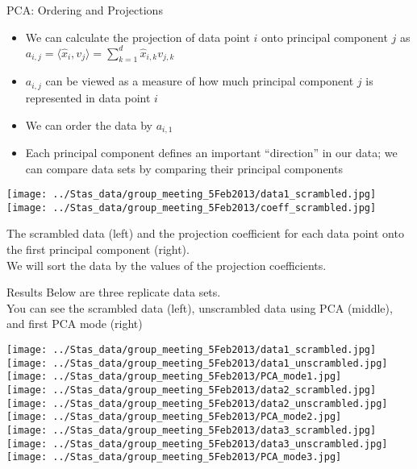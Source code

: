 \begin{frame}{PCA: Ordering and Projections}
    \begin{itemize}
        \item We can calculate the projection of data point $i$ onto principal component $j$ as $a_{i,j} = \langle \hat{x}_i, v_j \rangle = \sum_{k=1}^{d} \hat{x}_{i,k} v_{j,k}$
        \item $a_{i,j}$ can be viewed as a measure of how much principal component $j$ is represented in data point $i$
        \item We can order the data by $a_{i,1}$
        \item Each principal component defines an important ``direction'' in our data; we can compare data sets by comparing their principal components
    \end{itemize}

    \centering
    \texttt{[image: ../Stas\_data/group\_meeting\_5Feb2013/data1\_scrambled.jpg]}
    \texttt{[image: ../Stas\_data/group\_meeting\_5Feb2013/coeff\_scrambled.jpg]}\\
    {\Tiny The scrambled data (left) and the projection coefficient for each data point onto the first principal component (right).\\
    We will sort the data by the values of the projection coefficients. \par}

\end{frame}

\begin{frame}{Results}
  \centering
    Below are three replicate data sets.\\
    You can see the scrambled data (left), unscrambled data using PCA (middle), and first PCA mode (right)

    \texttt{[image: ../Stas\_data/group\_meeting\_5Feb2013/data1\_scrambled.jpg]}
    \texttt{[image: ../Stas\_data/group\_meeting\_5Feb2013/data1\_unscrambled.jpg]}
    \texttt{[image: ../Stas\_data/group\_meeting\_5Feb2013/PCA\_mode1.jpg]}\\
    \texttt{[image: ../Stas\_data/group\_meeting\_5Feb2013/data2\_scrambled.jpg]}
    \texttt{[image: ../Stas\_data/group\_meeting\_5Feb2013/data2\_unscrambled.jpg]}
    \texttt{[image: ../Stas\_data/group\_meeting\_5Feb2013/PCA\_mode2.jpg]}\\
    \texttt{[image: ../Stas\_data/group\_meeting\_5Feb2013/data3\_scrambled.jpg]}
    \texttt{[image: ../Stas\_data/group\_meeting\_5Feb2013/data3\_unscrambled.jpg]}
    \texttt{[image: ../Stas\_data/group\_meeting\_5Feb2013/PCA\_mode3.jpg]}

\end{frame}